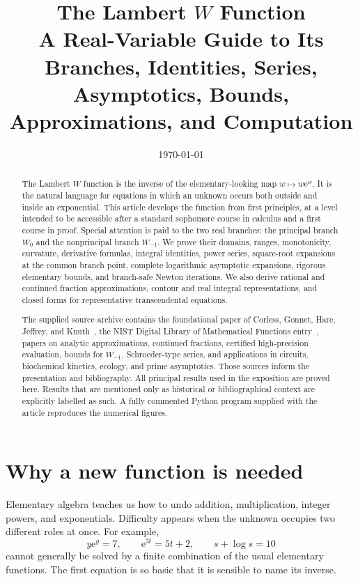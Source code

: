 \documentclass[11pt]{article}
\title{\textbf{The Lambert \(W\) Function}\\
\large A Real-Variable Guide to Its Branches, Identities, Series,
Asymptotics, Bounds, Approximations, and Computation}
\author{}
\date{\today}
\theoremstyle{remark}
\newcommand{\Wz}{W_0}
\newcommand{\Wm}{W_{-1}}
\newcommand{\ee}{\mathrm e}
\begin{document}
\maketitle

\begin{abstract}
The Lambert \(W\) function is the inverse of the elementary-looking map
\(w\mapsto w\ee^w\).  It is the natural language for equations in which an
unknown occurs both outside and inside an exponential.  This article develops
the function from first principles, at a level intended to be accessible after
a standard sophomore course in calculus and a first course in proof.  Special
attention is paid to the two real branches: the principal branch \(\Wz\) and
the nonprincipal branch \(\Wm\).  We prove their domains, ranges,
monotonicity, curvature, derivative formulas, integral identities, power
series, square-root expansions at the common branch point, complete
logarithmic asymptotic expansions, rigorous elementary bounds, and
branch-safe Newton iterations.  We also derive rational and continued
fraction approximations, contour and real integral representations, and
closed forms for representative transcendental equations.

The supplied source archive contains the foundational paper of Corless,
Gonnet, Hare, Jeffrey, and Knuth~\cite{corless1996}, the NIST Digital Library
of Mathematical Functions entry~\cite{dlmf}, papers on analytic approximations, continued fractions,
certified high-precision evaluation, bounds for \(\Wm\), Schroeder-type
series, and applications in circuits, biochemical kinetics, ecology, and
prime asymptotics.  Those sources inform the presentation and bibliography.
All principal results used in the exposition are proved here.  Results that
are mentioned only as historical or bibliographical context are explicitly
labelled as such.  A fully commented Python program supplied with the article
reproduces the numerical figures.
\end{abstract}

\tableofcontents
\clearpage

\section{Why a new function is needed}

Elementary algebra teaches us how to undo addition, multiplication, integer
powers, and exponentials.  Difficulty appears when the unknown occupies two
different roles at once.  For example,
\[
   y\ee^y=7,\qquad
   \ee^{3t}=5t+2,\qquad
   s+\log s=10
\]
cannot generally be solved by a finite combination of the usual elementary
functions.  The first equation is so basic that it is sensible to name its
inverse.
\end{document}
